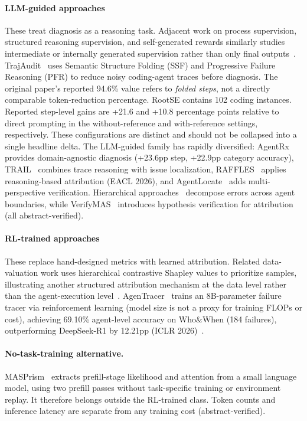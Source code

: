 \paragraph*{LLM-guided approaches}
These treat diagnosis as a reasoning task. Adjacent work on process supervision, structured reasoning supervision, and self-generated rewards similarly studies intermediate or internally generated supervision rather than only final outputs~\cite{liu-etal-2026-ips,jiang-etal-2026-drp,jiang2026scribestructuredmidlevelsupervision,lin2026cec}. TrajAudit~\cite{trajaudit2026} uses Semantic Structure Folding (SSF) and Progressive Failure Reasoning (PFR) to reduce noisy coding-agent traces before diagnosis. The original paper's reported 94.6\% value refers to \emph{folded steps}, not a directly comparable token-reduction percentage. RootSE contains 102 coding instances. Reported step-level gains are +21.6 and +10.8 percentage points relative to direct prompting in the without-reference and with-reference settings, respectively. These configurations are distinct and should not be collapsed into a single headline delta. The LLM-guided family has rapidly diversified: AgentRx~\cite{agentrx2026} provides domain-agnostic diagnosis (+23.6pp step, +22.9pp category accuracy), TRAIL~\cite{trail2025} combines trace reasoning with issue localization, RAFFLES~\cite{raffles2026} applies reasoning-based attribution (EACL 2026), and AgentLocate~\cite{agentlocate2026} adds multi-perspective verification. Hierarchical approaches~\cite{hierrerror2025} decompose errors across agent boundaries, while VerifyMAS~\cite{verifymas2026} introduces hypothesis verification for attribution (all abstract-verified).

\paragraph*{RL-trained approaches}
These replace hand-designed metrics with learned attribution. Related data-valuation work uses hierarchical contrastive Shapley values to prioritize samples, illustrating another structured attribution mechanism at the data level rather than the agent-execution level~\cite{xiao2026points}. AgenTracer~\cite{agentracer2026} trains an 8B-parameter failure tracer via reinforcement learning (model size is not a proxy for training FLOPs or cost), achieving 69.10\% agent-level accuracy on Who\&When (184 failures), outperforming DeepSeek-R1 by 12.21pp (ICLR 2026)~\cite{agentracer2026}. 

\paragraph*{No-task-training alternative.} MASPrism~\cite{masprism2026} extracts prefill-stage likelihood and attention from a small language model, using two prefill passes without task-specific training or environment replay. It therefore belongs outside the RL-trained class. Token counts and inference latency are separate from any training cost (abstract-verified).

